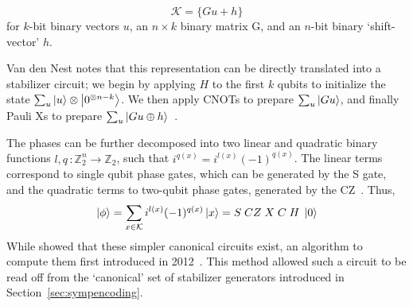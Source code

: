 \[
    \mathcal{K}=\{Gu + h\}
\]
for $k$-bit binary vectors $u$, an $n\times k$ binary matrix G, and an $n$-bit binary `shift-vector' $h$.\par
Van den Nest notes that this representation can be directly translated into a stabilizer circuit; we begin by applying $H$ to the first $k$ qubits to initialize the state $\sum_{u}\ket{u}\otimes\ket{0^{\otimes n-k}}$. We then apply CNOTs to prepare $\sum_{u}\ket{Gu}$, and finally Pauli Xs to prepare $\sum_{u}\ket{Gu\oplus h}$~\cite{VandenNest2008}.\par
The phases can be further decomposed into two linear and quadratic binary functions $l,q\,:\mathbb{Z}_{2}^{n}\rightarrow\mathbb{Z}_{2}$, such that $i^{q(x)}=i^{l(x)}(-1)^{q(x)}$. The linear terms correspond to single qubit phase gates, which can be generated by the S gate, and the quadratic terms to two-qubit phase gates, generated by the CZ~\cite{VandenNest2008}. Thus,
\begin{equation}
\ket{\phi}=\sum_{x\in\mathcal{K}}i^{l(x)}(-1)^{q(x)}\ket{x} = S\;CZ\;X\;C\;H\;\ket{0}
\label{eq:expandedaffinecirc}
\end{equation}
While \cite{VandenNest2008} showed that these simpler canonical circuits exist, an algorithm to compute them first introduced in 2012~\cite{Garcia2012}. This method allowed such a circuit to be read off from the `canonical' set of stabilizer generators introduced in Section~\ref{sec:sympencoding}. 
